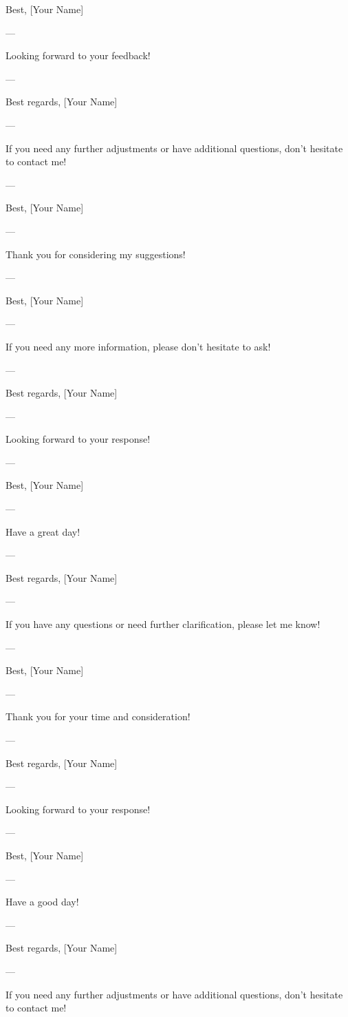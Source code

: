 Best,  
[Your Name]  

--- 

Looking forward to your feedback! 

--- 

Best regards,  
[Your Name]  

--- 

If you need any further adjustments or have additional questions, don't hesitate to contact me! 

--- 

Best,  
[Your Name]  

--- 

Thank you for considering my suggestions! 

--- 

Best,  
[Your Name]  

--- 

If you need any more information, please don't hesitate to ask! 

--- 

Best regards,  
[Your Name]  

--- 

Looking forward to your response! 

--- 

Best,  
[Your Name]  

--- 

Have a great day! 

--- 

Best regards,  
[Your Name]  

--- 

If you have any questions or need further clarification, please let me know! 

--- 

Best,  
[Your Name]  

--- 

Thank you for your time and consideration! 

--- 

Best regards,  
[Your Name]  

--- 

Looking forward to your response! 

--- 

Best,  
[Your Name]  

--- 

Have a good day! 

--- 

Best regards,  
[Your Name]  

--- 

If you need any further adjustments or have additional questions, don't hesitate to contact me! 


